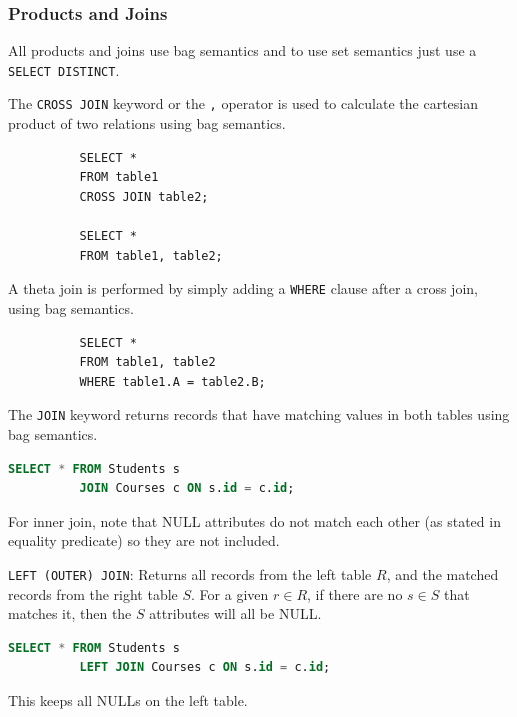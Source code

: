 \documentclass{article}
\begin{document}
    \subsubsection{Products and Joins} 

      All products and joins use bag semantics and to use set semantics just use a \texttt{SELECT DISTINCT}. 

      \begin{definition}
        The \texttt{CROSS JOIN} keyword or the \texttt{,} operator is used to calculate the cartesian product of two relations using bag semantics. 
        \begin{lstlisting}
          SELECT *
          FROM table1
          CROSS JOIN table2; 

          SELECT *
          FROM table1, table2; 
        \end{lstlisting} 
      \end{definition}

      \begin{definition}
        A theta join is performed by simply adding a \texttt{WHERE} clause after a cross join, using bag semantics. 
        \begin{lstlisting}
          SELECT *
          FROM table1, table2 
          WHERE table1.A = table2.B;
        \end{lstlisting}
      \end{definition} 

      \begin{definition}
        The \texttt{JOIN} keyword returns records that have matching values in both tables using bag semantics. 
        \begin{lstlisting}[language=SQL]
          SELECT * FROM Students s
          JOIN Courses c ON s.id = c.id;
        \end{lstlisting}
        For inner join, note that NULL attributes do not match each other (as stated in equality predicate) so they are not included. 
      \end{definition}

      \begin{definition}
        \texttt{LEFT (OUTER) JOIN}: Returns all records from the left table $R$, and the matched records from the right table $S$. For a given $r \in R$, if there are no $s \in S$ that matches it, then the $S$ attributes will all be NULL. 
        \begin{lstlisting}[language=SQL]
          SELECT * FROM Students s
          LEFT JOIN Courses c ON s.id = c.id;
        \end{lstlisting} 
        This keeps all NULLs on the left table. 
      \end{definition}
\end{document}
